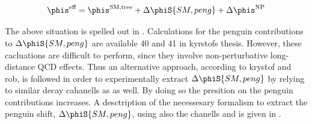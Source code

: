 \begin{equation}
\phis^{\text {eff}} = \phis^{\tiny \text{SM,tree}} + \Delta\phiS{SM,peng} + \Delta\phis^{\tiny \text{NP}}
 \label{phis_sm_peng}
\end{equation}

\noindent The above situation is spelled out in .
Calculations for the penguin contributions to $\Delta\phiS{SM,peng}$ are available {\color{red} 40 and 41 in kyrstofs thesis}.
However, these cacluations are difficult to perform, since they involve non-perturbative long-distance QCD effects. Thus an alternative
approach, according to {\color{red} krystof and rob}, is followed in order to experimentally extract $\Delta\phiS{SM,peng}$ by relying to
similar decay cahanells as \BsJpsiPhi as well. By doing so the presition on the penguin contributions increases. A desctription
of the necessesary formalism to extract the penguin shift, $\Delta\phiS{SM,peng}$, using also the chanells \BsJpsiKst and \BsJpsiRho is
given in .
